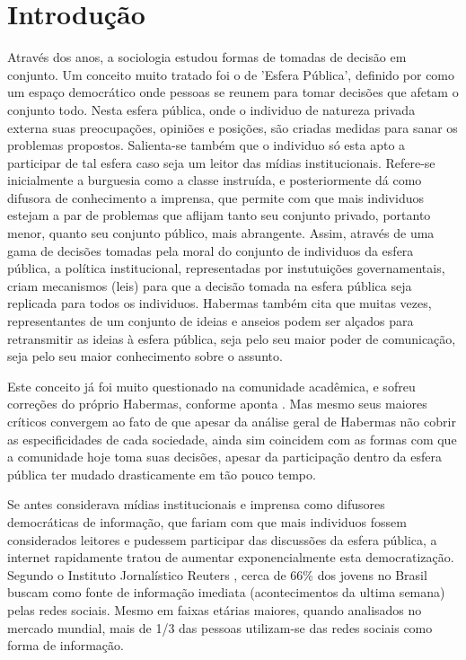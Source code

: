 \documentclass[
	12pt,				%
	oneside,			%
	a4paper,			%
	english,			%
	brazil				%
	]{abntex2ppgsi}
\begin{document}
\chapter{Introdução}
\label{sec:intro}

Através dos anos, a sociologia estudou formas de tomadas de decisão em conjunto. Um conceito muito tratado foi o de 'Esfera Pública', definido por  como um espaço democrático onde pessoas se reunem para tomar decisões que afetam o conjunto todo. Nesta esfera pública, onde o individuo de natureza privada externa suas preocupações, opiniões e posições, são criadas medidas para sanar os problemas propostos. Salienta-se também que o individuo só esta apto a participar de tal esfera caso seja um leitor das mídias institucionais. Refere-se inicialmente a burguesia como a classe instruída, e posteriormente dá como difusora de conhecimento a imprensa, que permite com que mais individuos estejam a par de problemas que aflijam tanto seu conjunto privado, portanto menor, quanto seu conjunto público, mais abrangente. Assim, através de uma gama de decisões tomadas pela moral do conjunto de individuos da esfera pública, a política institucional, representadas por instutuições governamentais, criam mecanismos (leis) para que a decisão tomada na esfera pública seja replicada para todos os individuos. Habermas também cita que muitas vezes, representantes de um conjunto de ideias e anseios podem ser alçados para retransmitir as ideias à esfera pública, seja pelo seu maior poder de comunicação, seja pelo seu maior conhecimento sobre o assunto. 

Este conceito já foi muito questionado na comunidade acadêmica, e sofreu correções do próprio Habermas, conforme aponta . Mas mesmo seus maiores críticos convergem ao fato de que apesar da análise geral de Habermas não cobrir as especificidades de cada sociedade, ainda sim coincidem com as formas com que a comunidade hoje toma suas decisões, apesar da participação dentro da esfera pública ter mudado drasticamente em tão pouco tempo.

Se antes  considerava mídias institucionais e imprensa como difusores democráticas de informação, que fariam com que mais individuos fossem considerados leitores e pudessem participar das discussões da esfera pública, a internet rapidamente tratou de aumentar exponencialmente esta democratização. Segundo o Instituto Jornalístico Reuters \cite{reuters}, cerca de 66\% dos jovens no Brasil buscam como fonte de informação imediata (acontecimentos da ultima semana) pelas redes sociais. Mesmo em faixas etárias maiores, quando analisados no mercado mundial, mais de 1/3 das pessoas utilizam-se das redes sociais como forma de informação.
\end{document}
